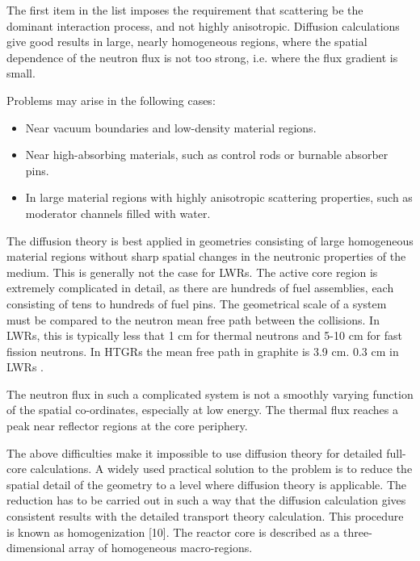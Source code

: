 \documentclass[11pt,letterpaper]{article}
\begin{document}
The first item in the list imposes the requirement that scattering be the dominant interaction process, and not highly anisotropic.
Diffusion calculations give good results in large, nearly homogeneous regions, where the spatial dependence
of the neutron flux is not too strong, i.e. where the flux gradient is small.

Problems may arise in the following cases:
\begin{itemize}
	\item Near vacuum boundaries and low-density material regions.
	\item Near high-absorbing materials, such as control rods or burnable absorber pins.
	\item In large material regions with highly anisotropic scattering properties, such as moderator channels filled with water.
\end{itemize}

The diffusion theory is best applied in geometries consisting of large homogeneous material regions without sharp spatial changes in the neutronic properties of the medium.
This is generally not the case for \glspl{LWR}.
The active core region is extremely complicated in detail, as there are hundreds of fuel assemblies, each consisting of tens to hundreds of fuel pins.
The geometrical scale of a system must be compared to the neutron mean free path between the
collisions.
In \glspl{LWR}, this is typically less that 1 cm for thermal neutrons and 5-10 cm for fast fission neutrons.
In \glspl{HTGR} the mean free path in graphite is 3.9 cm. 0.3 cm in \glspl{LWR} \cite{gougar_high_2019}.

The neutron flux in such a complicated system is not a smoothly varying function of the spatial co-ordinates, especially at low energy.
The thermal flux reaches a peak near reflector regions at the core periphery.

The above difficulties make it impossible to use diffusion theory for detailed full-core calculations.
A widely used practical solution to the problem is to reduce the spatial detail of the geometry to a level where diffusion theory is applicable. The reduction has to be carried out in such a way that the diffusion calculation gives consistent results with the detailed transport theory calculation.
This procedure is known as homogenization [10].
The reactor core is described as a three-dimensional array of homogeneous macro-regions.
\cite{leppanen_development_2007}
\end{document}
